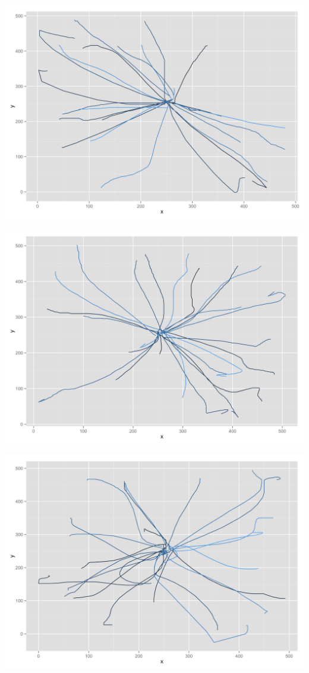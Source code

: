 \begin{appendices}
\begin{minipage}{\textwidth}
\begin{minipage}{0.5\linewidth}
		\includegraphics[width=\linewidth]{images/plots/plot_analysis_qualitative_225}
	\end{minipage}
	\begin{minipage}{0.5\linewidth}
		\includegraphics[width=\linewidth]{images/plots/plot_analysis_qualitative_161}
	\end{minipage}
	\begin{minipage}{0.5\linewidth}
		\includegraphics[width=\linewidth]{images/plots/plot_analysis_qualitative_235}

\end{minipage}
\end{minipage}
\end{appendices}
